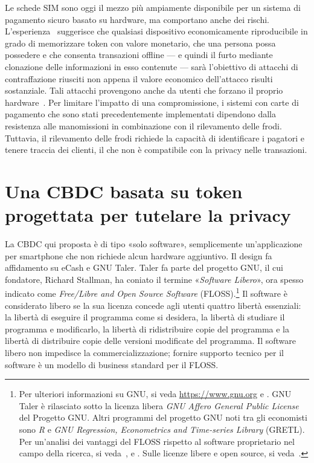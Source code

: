 \documentclass[a4paper]{article}
\begin{document}
Le schede SIM sono oggi il mezzo più ampiamente disponibile per un
sistema di pagamento sicuro basato su hardware, ma comportano anche
dei rischi. L'esperienza~\cite[si veda, ad esempio,][]{Soukup,Garcia,Kasper,CCC}
suggerisce che qualsiasi dispositivo economicamente riproducibile in grado
di memorizzare token con valore monetario, che una persona possa possedere
e che consenta transazioni offline --- e quindi il furto mediante
clonazione delle informazioni in esso contenute --- sarà l'obiettivo di
attacchi di contraffazione riusciti non appena il valore economico
dell'attacco risulti sostanziale. Tali attacchi provengono anche da
utenti che forzano il proprio hardware~\cite[vedi][]{Allen}. Per
limitare l'impatto di una compromissione, i sistemi con carte di pagamento
che sono stati precedentemente implementati dipendono dalla resistenza
alle manomissioni in combinazione con il rilevamento delle frodi.
Tuttavia, il rilevamento delle frodi richiede la capacità di identificare
i pagatori e tenere traccia dei clienti, il che non è compatibile con la
privacy nelle transazioni.

\section{Una CBDC basata su token progettata per tutelare la privacy}
\label{4.-una-cbdc-basata-su-token-progettata-per-tutelare-la-privacy}

La CBDC qui proposta è di tipo «solo software», semplicemente
un'applicazione per smartphone che non richiede alcun hardware aggiuntivo.
Il design fa affidamento su eCash e GNU Taler. Taler fa parte del progetto
GNU, il cui fondatore, Richard Stallman, ha coniato il termine
«\emph{Software Libero}», ora spesso indicato come \textit{Free/Libre
and Open Source Software} (FLOSS).\footnote{Per ulteriori informazioni
su GNU, si veda \url{https://www.gnu.org} e \cite{Stallman}. GNU Taler
è rilasciato sotto la licenza libera \textit{GNU Affero General Public
License} del Progetto GNU. Altri programmi del progetto GNU noti tra gli
economisti sono \textit{R} e \textit{GNU Regression, Econometrics and
Time-series Library} (GRETL). Per un'analisi dei vantaggi del FLOSS
rispetto al software proprietario nel campo della ricerca, si 
veda~\cite{Baiocchi}, \cite{Yalta2008} e \cite{Yalta2010}.
Sulle licenze libere e open source, si veda~\cite{Lerner}.} Il software
è considerato libero se la sua licenza concede agli utenti quattro libertà
essenziali: la libertà di eseguire il programma come si desidera, la
libertà di studiare il programma e modificarlo, la libertà di ridistribuire
copie del programma e la libertà di distribuire copie delle versioni
modificate del programma. Il software libero non impedisce la
commercializzazione; fornire supporto tecnico per il software è un modello
di business standard per il FLOSS.
\end{document}

